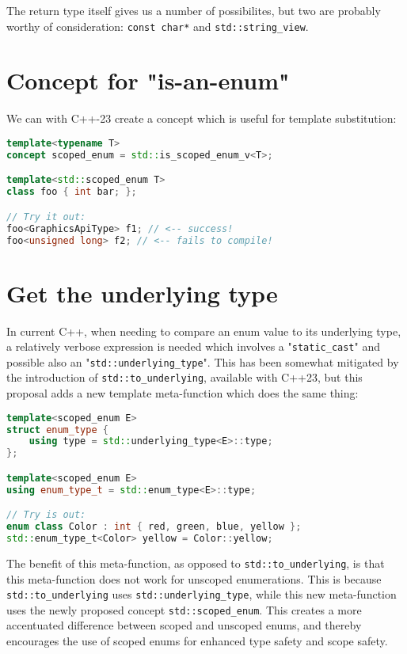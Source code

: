 \documentclass[
  format=manuscript,
  screen=true,
  review=false,
  nonacm=true,
  timestamp=true,
  balance=false]{acmart}
\begin{document}
\noindent
The return type itself gives us a number of possibilites, but two are probably worthy
of consideration: \texttt{const char*} and \texttt{std::string\_view}.

\section{Concept for "is-an-enum"}

We can with C++-23 create a concept which is useful for template substitution:\vspace{2mm}

\begin{lstlisting}[language=Cpp]
template<typename T>
concept scoped_enum = std::is_scoped_enum_v<T>;

template<std::scoped_enum T>
class foo { int bar; };

// Try it out:
foo<GraphicsApiType> f1; // <-- success!
foo<unsigned long> f2; // <-- fails to compile!
\end{lstlisting}

\section{Get the underlying type}

In current C++, when needing to compare an enum value to its underlying type,
a relatively verbose expression is needed which involves a "\texttt{static\_cast}"
and possible also an "\texttt{std::underlying\_type}". This has been somewhat
mitigated by the introduction of \texttt{std::to\_underlying}, available with C++23,
but this proposal adds a new template meta-function which does the same thing:\vspace{2mm}

\begin{lstlisting}[language=Cpp]
template<scoped_enum E>
struct enum_type {
    using type = std::underlying_type<E>::type;
};

template<scoped_enum E>
using enum_type_t = std::enum_type<E>::type;

// Try is out:
enum class Color : int { red, green, blue, yellow };
std::enum_type_t<Color> yellow = Color::yellow;
\end{lstlisting}

The benefit of this meta-function, as opposed to \texttt{std::to\_underlying}, is
that this meta-function does not work for unscoped enumerations. This is because
\texttt{std::to\_underlying} uses \texttt{std::underlying\_type}, while this new
meta-function uses the newly proposed concept \texttt{std::scoped\_enum}.
This creates a more accentuated difference between scoped and unscoped enums, and
thereby encourages the use of scoped enums for enhanced type safety and scope
safety.
\end{document}
